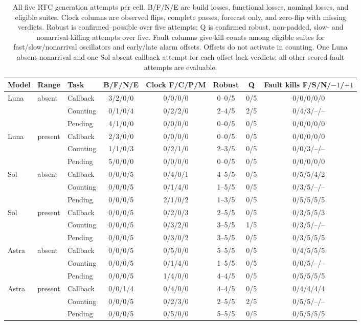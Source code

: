 \begin{table}[t]
\caption{All five RTC generation attempts per cell. B/F/N/E are build losses, functional losses, nominal losses, and eligible suites. Clock columns are observed flips, complete passes, forecast only, and zero-flip with missing verdicts. Robust is confirmed--possible over five attempts; Q is confirmed robust, non-padded, slow- and nonarrival-killing attempts over five. Fault columns give kill counts among eligible suites for fast/slow/nonarrival oscillators and early/late alarm offsets. Offsets do not activate in counting. One Luna absent nonarrival and one Sol absent callback attempt for each offset lack verdicts; all other scored fault attempts are evaluable.}
\label{tab:attempts}
\scriptsize
\begin{tabular}{@{}lllccccc@{}}
\toprule
Model & Range & Task & B/F/N/E & Clock F/C/P/M & Robust & Q & Fault kills F/S/N/$-1$/$+1$ \\
\midrule
Luna & absent & Callback & 3/2/0/0 & 0/0/0/0 & 0--0/5 & 0/5 & 0/0/0/0/0 \\
 & & Counting & 0/1/0/4 & 0/2/2/0 & 2--4/5 & 2/5 & 0/4/3/--/-- \\
 & & Pending & 4/1/0/0 & 0/0/0/0 & 0--0/5 & 0/5 & 0/0/0/0/0 \\
Luna & present & Callback & 2/3/0/0 & 0/0/0/0 & 0--0/5 & 0/5 & 0/0/0/0/0 \\
 & & Counting & 1/1/0/3 & 0/2/1/0 & 2--3/5 & 0/5 & 0/0/3/--/-- \\
 & & Pending & 5/0/0/0 & 0/0/0/0 & 0--0/5 & 0/5 & 0/0/0/0/0 \\
Sol & absent & Callback & 0/0/0/5 & 0/4/0/1 & 4--5/5 & 0/5 & 0/5/5/4/2 \\
 & & Counting & 0/0/0/5 & 0/1/4/0 & 1--5/5 & 0/5 & 0/3/5/--/-- \\
 & & Pending & 0/0/0/5 & 2/1/0/2 & 1--3/5 & 0/5 & 0/5/5/5/5 \\
Sol & present & Callback & 0/0/0/5 & 0/2/0/3 & 2--5/5 & 0/5 & 0/3/5/5/3 \\
 & & Counting & 0/0/0/5 & 0/3/2/0 & 3--5/5 & 1/5 & 0/3/5/--/-- \\
 & & Pending & 0/0/0/5 & 0/3/0/2 & 3--5/5 & 0/5 & 0/3/5/5/5 \\
Astra & absent & Callback & 0/0/0/5 & 0/5/0/0 & 5--5/5 & 0/5 & 0/4/5/5/5 \\
 & & Counting & 0/0/0/5 & 0/1/4/0 & 1--5/5 & 0/5 & 0/0/5/--/-- \\
 & & Pending & 0/0/0/5 & 1/4/0/0 & 4--4/5 & 0/5 & 0/5/5/5/5 \\
Astra & present & Callback & 0/0/1/4 & 0/4/0/0 & 4--4/5 & 0/5 & 0/4/4/4/4 \\
 & & Counting & 0/0/0/5 & 0/2/3/0 & 2--5/5 & 2/5 & 0/5/5/--/-- \\
 & & Pending & 0/0/0/5 & 0/5/0/0 & 5--5/5 & 0/5 & 0/5/5/5/5 \\
\bottomrule
\end{tabular}
\end{table}


